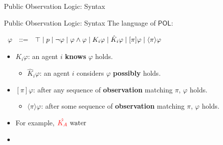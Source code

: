 \documentclass[usenames,dvipsnames]{beamer}
\newcommand\ldiaarg[1]{\langle#1\rangle}
\newcommand{\POL}{\mathsf{POL}}
\newcommand{\ep}{\ensuremath{\varepsilon}}
\renewcommand{\phi}{\varphi}
\begin{document}
\begin{frame}{Public Observation Logic: Syntax\footnotemark[1]}
\begin{itemize}
\begin{figure}
    \end{figure}
    \end{itemize}
\end{frame}


\begin{frame}{Public Observation Logic: Syntax\footnotemark[1]}
The language of $\POL$:
\vspace{.1cm}
			
		     $\begin{array}{r@{\quad::= \quad}l}
				\phi  &
				\top
				\mid
				p
				\mid \neg \phi
				\mid \phi \land \phi
				\mid K_i\phi
				\mid \hat{K}_i \phi
				\mid [\pi] \phi
				\mid \ldiaarg{\pi} \phi
			\end{array}$
			
			\vspace{.1cm}
    \begin{itemize}
        \item $K_i\varphi$: an agent $i$ \textbf{knows} $\varphi$ holds.
        \vspace{.1cm}
        \begin{itemize}
            \item $\hat{K}_i\phi$: an agent $i$ considers $\varphi$ \textbf{possibly} holds.
        \end{itemize}
        \vspace{.1cm}
        \item $[\pi]\varphi$: after any sequence of \textbf{observation} matching $\pi$, $\varphi$ holds.
        \vspace{.1cm}
        \begin{itemize}
            \item $\ldiaarg{\pi}\phi$: after some sequence of \textbf{observation} matching $\pi$, $\varphi$ holds.
        \end{itemize}
        \vspace{.1cm}
        \item For example, $\textcolor{red}{\hat{K_A}} \textrm{ water }$
    
    \item[]
    

\end{itemize}
\end{frame}
\end{document}
